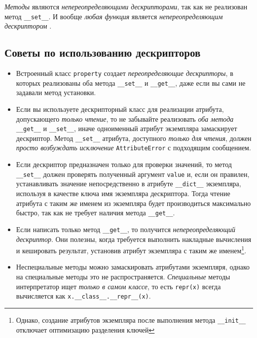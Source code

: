 \documentclass[%
	11pt,
	a4paper,
	utf8,
		]{article}
\begin{document}
\emph{Методы} являются \emph{непереопределяющими дескрипторами}, так как не реализован метод \verb|__set__|. И вообще \emph{любая функция} является \emph{непереопределяющим дескриптором} \cite[]{ramalho:python-2022}.

\subsection{Советы по использованию дескрипторов}

\begin{itemize}
	\item Встроенный класс \verb*|property| создает \emph{переопределяющие дескрипторы}, в которых реализованы оба метода \verb|__set__| и \verb*|__get__|, даже если вы сами не задавали метод установки.
	
	\item Если вы используете дескрипторный класс для реализации атрибута, допускающего \emph{только чтение}, то не забывайте реализовать \emph{оба метода} \verb|__get__| и \verb*|__set__|, иначе одноименный атрибут экземпляра замаскирует дескриптор. Метод \verb|__set__| атрибута, доступного \emph{только для чтения}, должен \emph{просто возбуждать исключение} \verb*|AttributeError| с подходящим сообщением.
	
	\item Если дескриптор предназначен только для проверки значений, то метод \verb|__set__| должен проверять полученный аргумент \verb*|value| и, если он правилен, устанавливать значение непосредственно в атрибуте \verb|__dict__| экземпляра, используя в качестве ключа имя экземпляра дескриптора. Тогда чтение атрибута с таким же именем из экземпляра будет производиться максимально быстро, так как не требует наличия метода \verb*|__get__|.
	
	\item Если написать только метод \verb|__get__|, то получится \emph{непереопределяющий дескриптор}. Они полезны, когда требуется выполнить накладные вычисления и кешировать результат, установив атрибут экземпляра с таким же именем\footnote{Однако, создание атрибутов экземпляра после выполнения метода \texttt{\_\_init\_\_} отключает оптимизацию разделения ключей}.
	
	\item Неспециальные методы можно замаскировать атрибутами экземпляря, однако на специальные методы это не распространяется. {\color{blue}\emph{Специальные} методы интерпретатор ищет \emph{только в самом классе}}, то есть \verb*|repr(x)| всегда вычисляется как \verb|x.__class__.__repr__(x)|.
\end{itemize}
\end{document}
